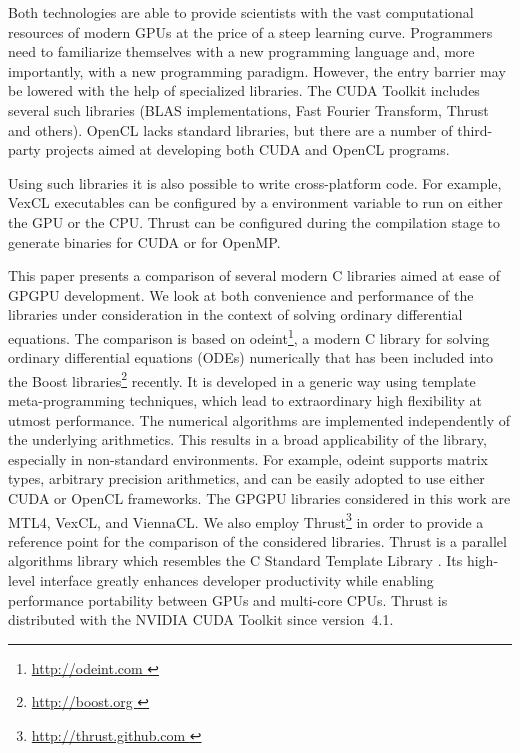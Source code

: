 \documentclass[final]{siamltex}
\newcommand{\addpp}[1]{{#1\nolinebreak[4]\hspace{-.05em}\raisebox{.4ex}{\tiny\bf ++}}\xspace}
\newcommand{\Cpp}{\addpp{C}}
\begin{document}
Both technologies are able to provide scientists with the vast computational
resources of modern GPUs at the price of a steep learning curve.  Programmers
need to familiarize themselves with a new programming language and, more
importantly, with a new programming paradigm. However, the entry barrier may be
lowered with the help of specialized libraries. The CUDA Toolkit includes
several such libraries (BLAS implementations, Fast Fourier Transform, Thrust
and others). OpenCL lacks standard libraries, but there are a number of
third-party projects aimed at developing both CUDA and OpenCL programs.

Using such libraries it is also possible to write cross-platform
code. For example, VexCL executables can be configured by a
environment variable to run on either the GPU or the CPU. Thrust can
be configured during the compilation stage to generate binaries for
CUDA or for OpenMP.

This paper presents a comparison of several modern \Cpp libraries aimed at ease
of GPGPU development. We look at both convenience and performance of the
libraries under consideration in the context of solving ordinary differential
equations.  The comparison is based on odeint\footnote{\href{
http://odeint.com }{ http://odeint.com } }, a modern \Cpp library for solving
ordinary differential equations (ODEs) numerically  \cite{OdeintRef2,OdeintRef1}
that has been included into the Boost
libraries\footnote{ \href{ http://boost.org } { http://boost.org } } recently.
It is developed in a generic way using template meta-programming techniques,
which lead to extraordinary high flexibility at utmost performance. The
numerical algorithms are implemented independently of the underlying
arithmetics. This results in a broad applicability of the library, especially
in non-standard environments.  For example, odeint supports matrix types,
arbitrary precision arithmetics, and can be easily adopted to use either CUDA
or OpenCL frameworks.  The GPGPU libraries considered in this work are MTL4,
VexCL, and ViennaCL. We also employ Thrust\footnote{ \href{
http://thrust.github.com }{ http://thrust.github.com }} in order to provide a
reference point for the comparison of the considered libraries.
Thrust is a parallel algorithms library which resembles the \Cpp Standard
Template Library \cite{ThrustRef}.  Its high-level interface greatly
enhances developer productivity while enabling performance portability between
GPUs and multi-core CPUs.  Thrust is distributed with the NVIDIA CUDA Toolkit
since version~4.1.
\end{document}
